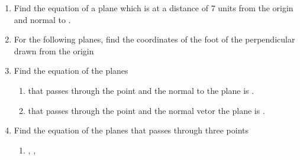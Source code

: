 \begin{enumerate}[label=\arabic*.,ref=\thesubsection.\theenumi]
\begin{enumerate}[itemsep=2pt]
\end{enumerate}
\item Find the equation of a plane which is at a distance of 7 units from the origin and normal to .
%
\item  For the following planes, find the coordinates of the foot of the perpendicular drawn from the origin
\begin{enumerate}[itemsep=2pt]
\end{enumerate}
\item Find the equation of the planes
\begin{enumerate}
\item that passes through the point  and the normal to the plane is .
\item that passes through the point  and the normal vetor the plane is .
\end{enumerate}
\item Find the equation of the planes that passes through three points
\begin{enumerate}
\item {}, , 

\end{enumerate}
\end{enumerate}
